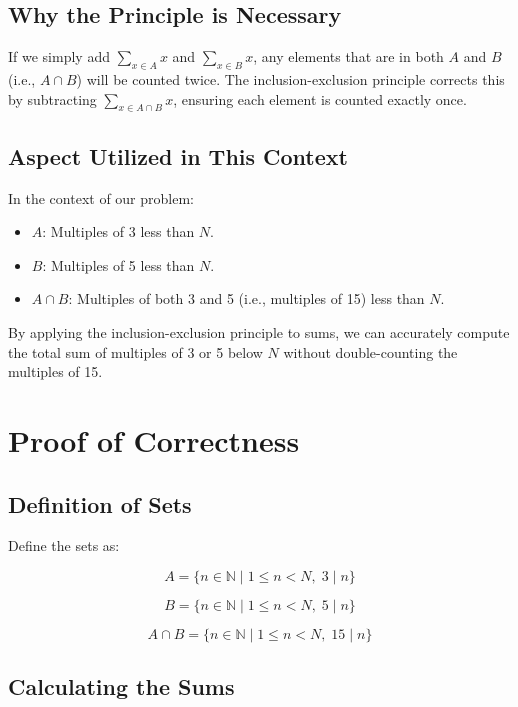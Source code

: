 \documentclass{article}
\begin{document}
\subsection*{Why the Principle is Necessary}

If we simply add \( \sum_{x \in A} x \) and \( \sum_{x \in B} x \), any elements that are in both \( A \) and \( B \) (i.e., \( A \cap B \)) will be counted twice. The inclusion-exclusion principle corrects this by subtracting \( \sum_{x \in A \cap B} x \), ensuring each element is counted exactly once.

\subsection*{Aspect Utilized in This Context}

In the context of our problem:

\begin{itemize}
    \item \( A \): Multiples of 3 less than \( N \).
    \item \( B \): Multiples of 5 less than \( N \).
    \item \( A \cap B \): Multiples of both 3 and 5 (i.e., multiples of 15) less than \( N \).
\end{itemize}

By applying the inclusion-exclusion principle to sums, we can accurately compute the total sum of multiples of 3 or 5 below \( N \) without double-counting the multiples of 15.

\section*{Proof of Correctness}

\subsection*{Definition of Sets}

Define the sets as:

\[
A = \{ n \in \mathbb{N} \mid 1 \leq n < N,\; 3 \mid n \}
\]

\[
B = \{ n \in \mathbb{N} \mid 1 \leq n < N,\; 5 \mid n \}
\]

\[
A \cap B = \{ n \in \mathbb{N} \mid 1 \leq n < N,\; 15 \mid n \}
\]

\subsection*{Calculating the Sums}
\end{document}
